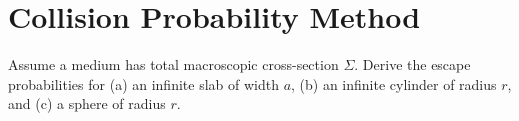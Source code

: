 \chapter{Collision Probability Method}
\label{lec:cpm}

\begin{exercises}
  \item Assume a medium has total macroscopic cross-section $\Sigma$.  Derive the escape probabilities for (a) an infinite slab of width $a$, (b) an infinite cylinder of radius $r$, and (c) a sphere of radius $r$.
\end{exercises}
